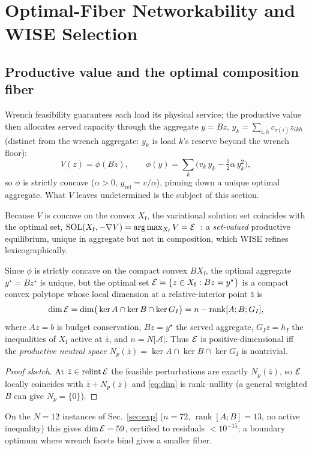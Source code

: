 \section{Optimal-Fiber Networkability and WISE Selection}
\label{sec:wise}

\subsection{Productive value and the optimal composition fiber}
Wrench feasibility guarantees each load its physical service; the productive value then
allocates served capacity through the aggregate $y=Bz$, $y_k=\sum_{i,h}c_{\tau(i)}z_{ikh}$
(distinct from the wrench aggregate: $y_k$ is load $k$'s reserve beyond the wrench floor):
\begin{equation}
V(z)=\phi(Bz),\qquad
\phi(y)=\sum_k\big(v_k\,y_k-\tfrac12\alpha\,y_k^2\big),
\label{eq:value}
\end{equation}
so $\phi$ is strictly concave ($\alpha>0$, $y_{\mathrm{ref}}=v/\alpha$), pinning down a
unique optimal aggregate. What $V$ leaves undetermined is the subject of this section.

Because $V$ is concave on the convex $X_{\mathrm f}$, the variational solution set coincides
with the optimal set, $\operatorname{SOL}(X_{\mathrm f},-\nabla V)=\arg\max_{X_{\mathrm f}}V
=\mathcal{E}$~\cite{facchinei2003fvi}: a \emph{set-valued} productive equilibrium, unique in
aggregate but not in composition, which WISE refines lexicographically.

\begin{theorem}\label{thm:degeneracy}
Since $\phi$ is strictly concave on the compact convex $BX_{\mathrm f}$, the optimal aggregate
$y^{\star}=Bz^{\star}$ is unique, but the optimal set
$\mathcal{E}=\{z\in X_{\mathrm f}:Bz=y^{\star}\}$ is a compact convex polytope whose local
dimension at a relative-interior point $\bar z$ is
\begin{equation}
\dim\mathcal{E}=\dim\!\big(\ker A\cap\ker B\cap\ker G_I\big)
=n-\operatorname{rank}[A;B;G_I],
\label{eq:dim}
\end{equation}
where $Az=b$ is budget conservation, $Bz=y^{\star}$ the served aggregate, $G_Iz=h_I$ the
inequalities of $X_{\mathrm f}$ active at $\bar z$, and $n=N|\mathcal A|$. Thus $\mathcal{E}$ is
positive-dimensional iff the \emph{productive neutral space}
$N_p(\bar z)=\ker A\cap\ker B\cap\ker G_I$ is nontrivial.
\end{theorem}
\begin{proof}[Proof sketch]
At $\bar z\in\operatorname{relint}\mathcal{E}$ the feasible perturbations are exactly
$N_p(\bar z)$, so $\mathcal{E}$ locally coincides with $\bar z+N_p(\bar z)$ and \eqref{eq:dim} is
rank--nullity (a general weighted $B$ can give $N_p=\{0\}$).
\end{proof}
On the $N{=}12$ instances of Sec.~\ref{sec:exp} ($n=72$, $\operatorname{rank}[A;B]=13$, no
active inequality) this gives $\dim\mathcal{E}=59$, certified to residuals $<10^{-15}$; a
boundary optimum where wrench facets bind gives a smaller fiber.

